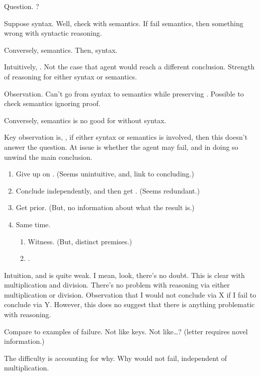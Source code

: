 \begin{note}
  Question.
  \zS{}?

  Suppose syntax.
  Well, check with semantics.
  If fail semantics, then something wrong with syntactic reasoning.

  Conversely, semantics.
  Then, syntax.

  Intuitively, .
  Not the case that agent would reach a different conclusion.
  Strength of reasoning for either syntax or semantics.

  Observation.
  Can't go from syntax to semantics while preserving \zS{}.
  Possible to check semantics ignoring proof.

  Conversely, semantics is no good for \zS{} without syntax.

  Key observation is, \zS{}, if either syntax or semantics is involved, then this doesn't answer the question.
  At issue is whether the agent may fail, and in doing so unwind the main conclusion.
\end{note}

\begin{note}[Options]
  \begin{enumerate}
  \item
    Give up on \zS{}.
    {
      \color{red}
      (Seems unintuitive, and, link to concluding.)
    }
  \item
    Conclude independently, and then get \zS{}.
    {
      \color{red}
      (Seems redundant.)
    }
  \item
    Get  prior.
    {
      \color{red}
      (But, no information about what the result is.)
    }
  \item
    Same time.
    \begin{enumerate}
    \item
      Witness.
      {
        \color{red}
        (But, distinct premises.)
      }
    \item
      .
    \end{enumerate}
  \end{enumerate}
\end{note}

\begin{note}[Give up on \zS{}]
  Intuition, and \zS{} is quite weak.
  I mean, look, there's no doubt.
  This is clear with multiplication and division.
  There's no problem with reasoning via either multiplication or division.
  Observation that I would not conclude via X if I fail to conclude via Y.
  However, this does no suggest that there is anything problematic with reasoning.

  Compare to examples of failure.
  Not like keys.
  Not like\dots? (letter requires novel information.)

  The difficulty is accounting for why.
  Why would not fail, independent of multiplication.
\end{note}


